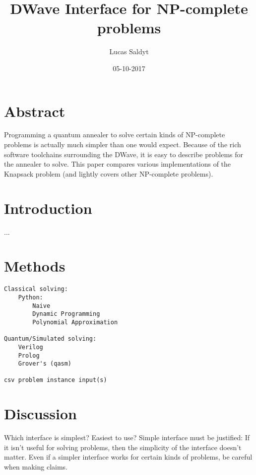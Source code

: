 \documentclass{article}
\title{DWave Interface for NP-complete problems}
\date{05-10-2017}
\author{Lucas Saldyt}
\begin{document}
\maketitle
{}
\newpage
{}

\section{Abstract}

Programming a quantum annealer to solve certain kinds of NP-complete problems is actually much simpler than one would expect.
Because of the rich software toolchains surrounding the DWave, it is easy to describe problems for the annealer to solve.
This paper compares various implementations of the Knapsack problem (and lightly covers other NP-complete problems).

\section{Introduction}

...

\section{Methods}

\begin{verbatim}
Classical solving:
    Python:
        Naive
        Dynamic Programming
        Polynomial Approximation

Quantum/Simulated solving:
    Verilog
    Prolog
    Grover's (qasm)

csv problem instance input(s)
\end{verbatim}

\section{Discussion}

Which interface is simplest? Easiest to use?
Simple interface must be justified: If it isn't useful for solving problems, then the simplicity of the interface doesn't matter.
Even if a simpler interface works for certain kinds of problems, be careful when making claims.
\end{document}
